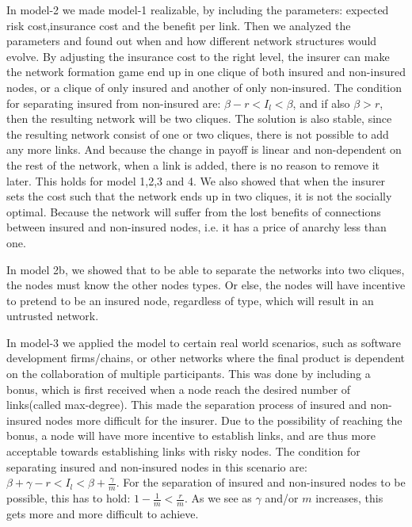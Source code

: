  In model-2 we made model-1 realizable, by including the parameters: expected risk cost,insurance cost and the benefit per link. Then we analyzed the parameters and found out when and how different network structures would evolve. By adjusting the insurance cost to the right level, the insurer can make the network formation game end up in one clique of both insured and non-insured nodes, or a clique of only insured and another of only non-insured. The condition for separating insured from non-insured are: $\beta-r<I_{l}<\beta$, and if also $\beta>r$, then the resulting network will be two cliques. The solution is also stable, since the resulting network consist of one or two cliques, there is not possible to add any more links. And because the change in payoff is linear and non-dependent on the rest of the network, when a link is added, there is no reason to remove it later. This holds for model 1,2,3 and 4.
We also showed that when the insurer sets the cost such that the network ends up in two cliques, it is not the socially optimal. Because the network will suffer from the lost benefits of connections between insured and non-insured nodes, i.e. it has a price of anarchy less than one. 

In model 2b, we showed that to be able to separate the networks into two cliques, the nodes must know the other nodes types. Or else, the nodes will have incentive to pretend to be an insured node, regardless of type, which will result in an untrusted network.

In model-3 we applied the model to certain real world scenarios, such as software development firms/chains, or other networks where the final product is dependent on the collaboration of multiple participants.
This was done by including a bonus, which is first received when a node reach the desired number of links(called max-degree). This made the separation process of insured and non-insured nodes more difficult for the insurer. Due to the possibility of reaching the bonus, a node will have more incentive to establish links, and are thus more acceptable towards establishing links with risky nodes. The condition for separating insured and non-insured nodes in this scenario are: $\beta+\gamma-r<I_{l}<\beta+\frac{\gamma}{m}$. For the separation of insured and non-insured nodes to be possible, this has to hold: $1-\frac{1}{m}<\frac{r}{m}$. As we see as $\gamma$ and/or $m$ increases, this gets more and more difficult to achieve. 

